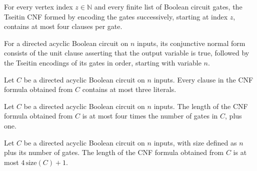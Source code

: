 \begin{theorem}
\label{BoolCircuit.length_tseitinGates_le}
\leanok
{}
For every vertex index $z\in\mathbb{N}$ and every finite list of Boolean circuit gates,
the Tseitin CNF formed by encoding the gates successively, starting at index $z$,
contains at most four clauses per gate.
\end{theorem}

\begin{definition}
\label{BoolCircuit.DAGCircuit.toCNF}
\leanok
{}
For a directed acyclic Boolean circuit on $n$ inputs, its conjunctive normal form
consists of the unit clause asserting that the output variable is true, followed by the
Tseitin encodings of its gates in order, starting with variable $n$.
\end{definition}

\begin{theorem}
\label{BoolCircuit.DAGCircuit.toCNF_widthAtMost}
\leanok
{}
Let $C$ be a directed acyclic Boolean circuit on $n$ inputs. Every clause in the CNF
formula obtained from $C$ contains at most three literals.
\end{theorem}

\begin{theorem}
\label{BoolCircuit.DAGCircuit.toCNF_length_le_gates}
\leanok
{}
Let $C$ be a directed acyclic Boolean circuit on $n$ inputs. The length of the CNF
formula obtained from $C$ is at most four times the number of gates in $C$, plus one.
\end{theorem}

\begin{theorem}
\label{BoolCircuit.DAGCircuit.toCNF_length_le}
\leanok
{}
Let $C$ be a directed acyclic Boolean circuit on $n$ inputs, with size defined as $n$
plus its number of gates. The length of the CNF formula obtained from $C$ is at most
$4\,\mathrm{size}(C)+1$.
\end{theorem}

